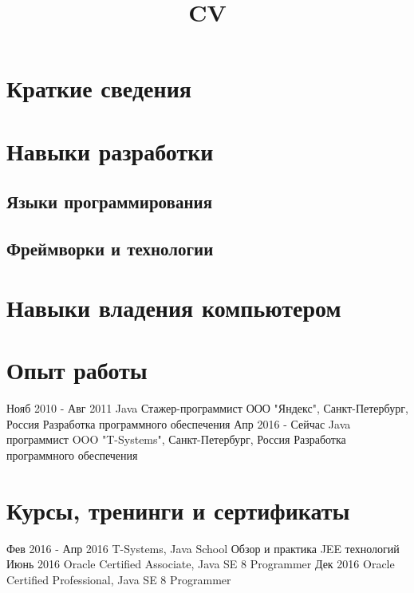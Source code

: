 \documentclass[11pt,a4paper,russian]{moderncv}
\title{CV}
\begin{document}
\maketitle

\section{Краткие сведения}
  
\section{Навыки разработки}

\subsection{Языки программирования}

\subsection{Фреймворки и технологии}

\section{Навыки владения компьютером}
  
\section{Опыт работы}
\cventry
    {Нояб 2010 - Авг 2011}
    {Java Стажер-программист}
    {ООО "Яндекс", Санкт-Петербург, Россия}{}{}
    {Разработка программного обеспечения}
\cventry
    {Апр 2016 - Сейчас}
    {Java программист}
    {OOO "T-Systems", Санкт-Петербург, Россия}{}{}
    {Разработка программного обеспечения}
  
\section{Курсы, тренинги и сертификаты}
\cvline
    {Фев 2016 - Апр 2016}
    {T-Systems, Java School \newline
    Обзор и практика JEE технологий} 
\cvline
    {Июнь 2016}
    {Oracle Certified Associate, Java SE 8 Programmer}
\cvline
    {Дек 2016}
    {Oracle Certified Professional, Java SE 8 Programmer}
  
\end{document}
